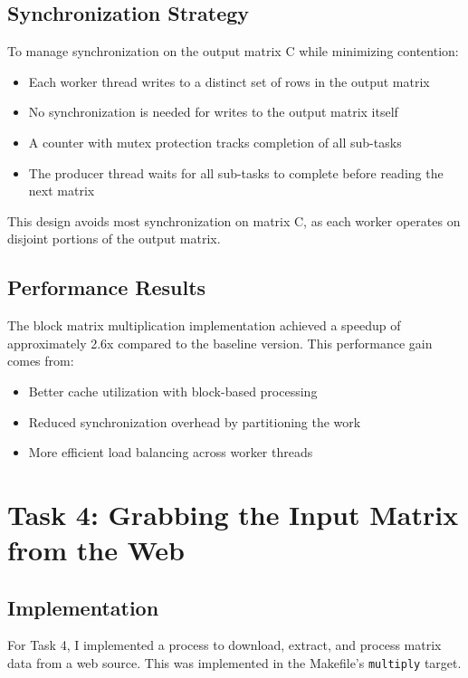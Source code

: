 \documentclass[11pt,a4paper]{article}
\begin{document}
\subsection{Synchronization Strategy}
To manage synchronization on the output matrix C while minimizing contention:

\begin{itemize}
    \item Each worker thread writes to a distinct set of rows in the output matrix
    \item No synchronization is needed for writes to the output matrix itself
    \item A counter with mutex protection tracks completion of all sub-tasks
    \item The producer thread waits for all sub-tasks to complete before reading the next matrix
\end{itemize}

This design avoids most synchronization on matrix C, as each worker operates on disjoint portions of the output matrix.

\subsection{Performance Results}
The block matrix multiplication implementation achieved a speedup of approximately 2.6x compared to the baseline version. This performance gain comes from:

\begin{itemize}
    \item Better cache utilization with block-based processing
    \item Reduced synchronization overhead by partitioning the work
    \item More efficient load balancing across worker threads
\end{itemize}

\section{Task 4: Grabbing the Input Matrix from the Web}

\subsection{Implementation}
For Task 4, I implemented a process to download, extract, and process matrix data from a web source. This was implemented in the Makefile's \texttt{multiply} target.
\end{document}
